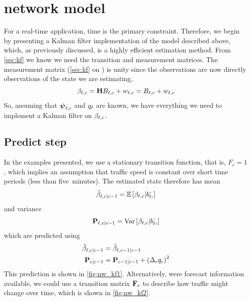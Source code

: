 \section{\Rt{} network model}
\label{sec:nw_realtime}

For a real-time application, time is the primary constraint. Therefore, we begin by presenting a Kalman filter implementation of the model described above, which, as previously discussed, is a highly efficient estimation method. From \cref{sec:kf} we know we need the transition and measurement matrices. The measurement matrix (\cref{sec:kf} on ) is unity since the observations are now directly observations of the state we are estimating,
\begin{equation}
\label{eq:kf_meas_identity}
\beta_{\ell,c} = \mathbf{H}B_{\ell,c} + w_{\ell,c} = B_{\ell,c} + w_{\ell,c}
\end{equation}
So, assuming that $\mathbf{\boldsymbol{\psi}}_{\ell,c}$ and $q_{\ell}$ are known, we have everything we need to implement a Kalman filter on $\beta_{\ell,c}$.


\subsection{Predict step}
\label{sec:kf_predict}

In the examples presented, we use a stationary transition function, that is, $F_c = 1$, which implies an assumption that traffic speed is constant over short time periods (less than five~minutes). The estimated state therefore has mean
\begin{equation}\label{eq:ch4:nw_state_mean_est}
\hat{\beta}_{\ell,c|c-1} =
    \mathbb{E}\left[\beta_{\ell,c} | b_{\ell \boldsymbol{\cdot}}^{\boldsymbol{\cdot}}\right]
\end{equation}
and variance
\begin{equation}\label{eq:ch4:nw_state_var_est}
\mathbf{P}_{\ell,c|c-1} =
    \mathrm{Var}\left[\beta_{\ell,c} | b_{\ell \boldsymbol{\cdot}}^{\boldsymbol{\cdot}}\right]
\end{equation}
which are predicted using
\begin{equation}
\label{eq:nw_kf_predict}
\begin{split}
\hat{\beta}_{\ell,c|c-1} &=
    \hat{\beta}_{
\ell,c-1|c-1} \\
\mathbf{P}_{c|c-1} &= \mathbf{P}_{c-1|c-1} + \left(\Delta_cq_c\right)^2
\end{split}
\end{equation}
This prediction is shown in \cref{fig:nw_kf1}. Alternatively, were forecast information available, we could use a transition matrix $\mathbf{F}_c$ to describe how traffic might change over time, which is shown in \cref{fig:nw_kf2}.


